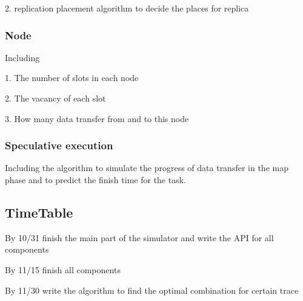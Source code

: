 \documentclass{Project}
\begin{document}
2. replication placement algorithm to decide the places for replica

\subsubsection{Node}
Including

1. The number of slots in each node 

2. The vacancy of each slot 

3. How many data transfer from and to this node

\subsubsection{Speculative execution}
Including the algorithm to simulate the progress of data transfer in the map phase and to predict the finish time for the task. 

\subsection{TimeTable}
By 10/31 finish the main part of the simulator and write the API for all components

By 11/15 finish all components

By 11/30 write the algorithm to find the optimal combination for certain trace
\end{document}
